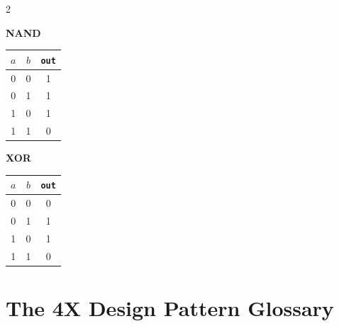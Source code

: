\documentclass[11pt,a4paper,openany]{book}
\theoremstyle{plain}
\theoremstyle{definition}
\theoremstyle{remark}
\begin{document}
\vspace{1em}

\begin{multicols}{2}

\noindent\textbf{NAND}\\[4pt]
\begin{tabular}{cc|c}
  \toprule
  $a$ & $b$ & \texttt{out} \\
  \midrule
  0 & 0 & 1 \\
  0 & 1 & 1 \\
  1 & 0 & 1 \\
  1 & 1 & 0 \\
  \bottomrule
\end{tabular}

\columnbreak

\noindent\textbf{XOR}\\[4pt]
\begin{tabular}{cc|c}
  \toprule
  $a$ & $b$ & \texttt{out} \\
  \midrule
  0 & 0 & 0 \\
  0 & 1 & 1 \\
  1 & 0 & 1 \\
  1 & 1 & 0 \\
  \bottomrule
\end{tabular}

\end{multicols}

\chapter{The 4X Design Pattern Glossary}
\label{app:glossary}
\end{document}
